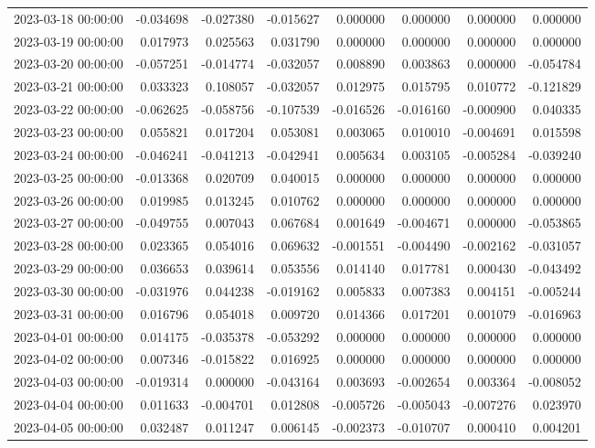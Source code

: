 \begin{tabular}{lrrrrrrr}
2023-03-18 00:00:00 & -0.034698 & -0.027380 & -0.015627 & 0.000000 & 0.000000 & 0.000000 & 0.000000 \\
2023-03-19 00:00:00 & 0.017973 & 0.025563 & 0.031790 & 0.000000 & 0.000000 & 0.000000 & 0.000000 \\
2023-03-20 00:00:00 & -0.057251 & -0.014774 & -0.032057 & 0.008890 & 0.003863 & 0.000000 & -0.054784 \\
2023-03-21 00:00:00 & 0.033323 & 0.108057 & -0.032057 & 0.012975 & 0.015795 & 0.010772 & -0.121829 \\
2023-03-22 00:00:00 & -0.062625 & -0.058756 & -0.107539 & -0.016526 & -0.016160 & -0.000900 & 0.040335 \\
2023-03-23 00:00:00 & 0.055821 & 0.017204 & 0.053081 & 0.003065 & 0.010010 & -0.004691 & 0.015598 \\
2023-03-24 00:00:00 & -0.046241 & -0.041213 & -0.042941 & 0.005634 & 0.003105 & -0.005284 & -0.039240 \\
2023-03-25 00:00:00 & -0.013368 & 0.020709 & 0.040015 & 0.000000 & 0.000000 & 0.000000 & 0.000000 \\
2023-03-26 00:00:00 & 0.019985 & 0.013245 & 0.010762 & 0.000000 & 0.000000 & 0.000000 & 0.000000 \\
2023-03-27 00:00:00 & -0.049755 & 0.007043 & 0.067684 & 0.001649 & -0.004671 & 0.000000 & -0.053865 \\
2023-03-28 00:00:00 & 0.023365 & 0.054016 & 0.069632 & -0.001551 & -0.004490 & -0.002162 & -0.031057 \\
2023-03-29 00:00:00 & 0.036653 & 0.039614 & 0.053556 & 0.014140 & 0.017781 & 0.000430 & -0.043492 \\
2023-03-30 00:00:00 & -0.031976 & 0.044238 & -0.019162 & 0.005833 & 0.007383 & 0.004151 & -0.005244 \\
2023-03-31 00:00:00 & 0.016796 & 0.054018 & 0.009720 & 0.014366 & 0.017201 & 0.001079 & -0.016963 \\
2023-04-01 00:00:00 & 0.014175 & -0.035378 & -0.053292 & 0.000000 & 0.000000 & 0.000000 & 0.000000 \\
2023-04-02 00:00:00 & 0.007346 & -0.015822 & 0.016925 & 0.000000 & 0.000000 & 0.000000 & 0.000000 \\
2023-04-03 00:00:00 & -0.019314 & 0.000000 & -0.043164 & 0.003693 & -0.002654 & 0.003364 & -0.008052 \\
2023-04-04 00:00:00 & 0.011633 & -0.004701 & 0.012808 & -0.005726 & -0.005043 & -0.007276 & 0.023970 \\
2023-04-05 00:00:00 & 0.032487 & 0.011247 & 0.006145 & -0.002373 & -0.010707 & 0.000410 & 0.004201 \\

\end{tabular}
